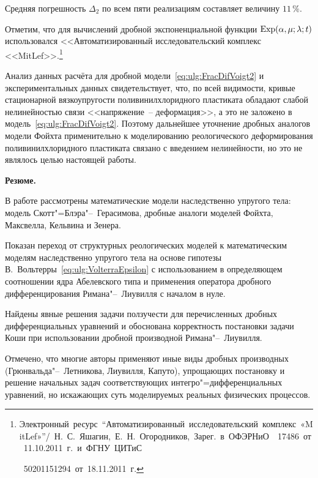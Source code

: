 Средняя погрешность $\Delta_{2}$ по всем пяти реализациям составляет величину $11\,\%$. 

Отметим, что для вычислений дробной экспоненциальной функции $  \mathop{\rm Exp}\nolimits  (\alpha,\mu;\lambda;t)$ использовался <<Автоматизированный исследовательский комплекс \mbox{<<MitLef>>.\footnote{Электронный ресурс ``Автоматизированный исследовательский комплекс «MitLef»''/ Н.~С.~Яшагин, Е.~Н.~Огородников, Зарег. в ОФЭРНиО \No~17486 от 11.10.2011~г. и ФГНУ ЦИТиС

\No~50201151294 от 18.11.2011~г.}}



Анализ данных расчёта для дробной модели~\eqref{eq:ulg:FracDifVoigt2} и экспериментальных данных свидетельствует, что, по всей видимости, кривые стационарной вязкоупругости поливинилхлоридного пластиката обладают слабой нелинейностью связи <<напряжение~-- деформация>>, а это не заложено в модель~\eqref{eq:ulg:FracDifVoigt2}. Поэтому дальнейшее уточнение дробных аналогов модели Фойхта применительно к моделированию реологического деформирования поливинилхлоридного пластиката связано с введением нелинейности, но это не являлось целью настоящей работы.



\smallskip



\textbf{Резюме.}

В работе рассмотрены математические модели наследственно упругого тела: модель Скотт"=Блэра"--~Герасимова, дробные аналоги моделей Фойхта, Максвелла, Кельвина и Зенера.

Показан переход от структурных реологических моделей к математическим моделям наследственно упругого тела на основе гипотезы В.~Вольтерры~\eqref{eq:ulg:VolterraEpsilon} с использованием в определяющем соотношении ядра Абелевского типа и применения оператора дробного дифференцирования Римана"--~Лиувилля с началом в нуле.

Найдены явные решения задачи  ползучести для перечисленных дробных дифференциальных уравнений и обоснована корректность постановки задачи Коши при использовании дробной производной Римана"--~Лиувилля.

Отмечено, что многие авторы применяют иные виды дробных производных (Грюнвальда"--~Летникова, Лиувилля, Капуто), упрощающих постановку и решение начальных задач соответствующих интегро"=дифференциальных уравнений, но искажающих суть моделируемых реальных физических процессов.



